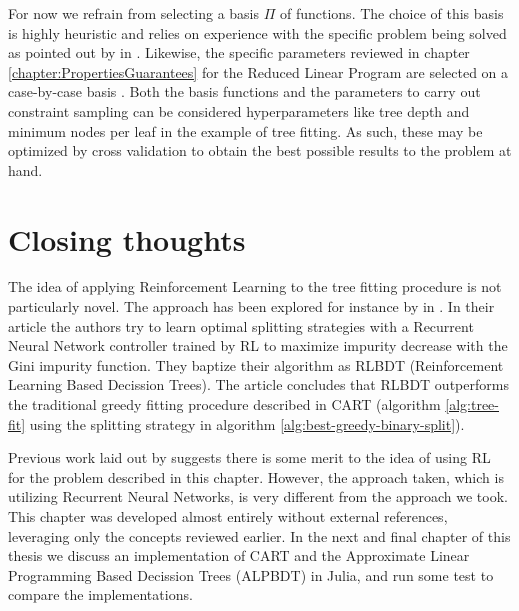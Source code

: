 For now we refrain from selecting a basis $\Pi$ of functions. The choice of this
basis is highly heuristic and relies on experience with the specific problem
being solved as pointed out by \citeauthor{farias2003LP2ADP} in
\cite{farias2003LP2ADP}. Likewise, the specific parameters reviewed in chapter
\ref{chapter:PropertiesGuarantees} for the Reduced Linear Program are selected
on a case-by-case basis \cite{farias2004constraint}. Both the basis functions
and the parameters to carry out constraint sampling can be considered
hyperparameters like tree depth and minimum nodes per leaf in the example of
tree fitting. As such, these may be optimized by cross validation to obtain the
best possible results to the problem at hand.  

\section{Closing thoughts}

The idea of applying Reinforcement Learning to the tree fitting procedure is not
particularly novel. The approach has been explored for instance by
\citeauthor{xiong} in \cite{xiong}. In their article the authors try to learn
optimal splitting strategies with a Recurrent Neural Network controller trained
by RL to maximize impurity decrease with the Gini impurity function. They
baptize their algorithm as RLBDT (Reinforcement Learning Based Decission Trees).
The article concludes that RLBDT outperforms the traditional greedy fitting
procedure described in CART (algorithm \ref{alg:tree-fit} using the splitting
strategy in algorithm \ref{alg:best-greedy-binary-split}).

Previous work laid out by \citeauthor{xiong} suggests there is some merit to the
idea of using RL for the problem described in this chapter. However, the
approach taken, which is utilizing Recurrent Neural Networks, is very different
from the approach we took. This chapter was developed almost entirely without
external references, leveraging only the concepts reviewed earlier. In the next
and final chapter of this thesis we discuss an implementation of CART and the
Approximate Linear Programming Based Decission Trees (ALPBDT) in Julia, and run
some test to compare the implementations.